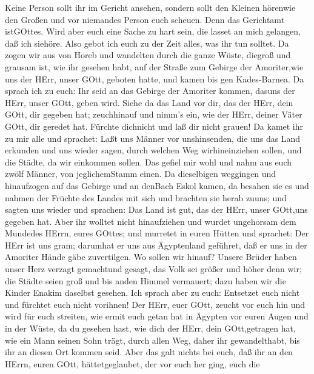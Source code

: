  Keine Person sollt ihr im Gericht ansehen, sondern sollt
den Kleinen hörenwie den Großen und vor niemandes Person euch scheuen.
Denn das Gerichtamt istGOttes. Wird aber euch eine Sache zu hart sein,
die lasset an mich gelangen, daß ich siehöre.  Also gebot
ich euch zu der Zeit alles, was ihr tun solltet.  Da zogen
wir aus von Horeb und wandelten durch die ganze Wüste, diegroß und
grausam ist, wie ihr gesehen habt, auf der Straße zum Gebirge der
Amoriter,wie uns der HErr, unser GOtt, geboten hatte, und kamen bis gen
Kades-Barnea.  Da sprach ich zu euch: Ihr seid an das
Gebirge der Amoriter kommen, dasuns der HErr, unser GOtt, geben wird.
 Siehe da das Land vor dir, das der HErr, dein GOtt, dir
gegeben hat; zeuchhinauf und nimm's ein, wie der HErr, deiner Väter
GOtt, dir geredet hat. Fürchte dichnicht und laß dir nicht grauen!
 Da kamet ihr zu mir alle und sprachet: Laßt uns Männer vor
unshinsenden, die uns das Land erkunden und uns wieder sagen, durch
welchen Weg wirhineinziehen sollen, und die Städte, da wir einkommen
sollen.  Das gefiel mir wohl und nahm aus euch zwölf
Männer, von jeglichemStamm einen.  Da dieselbigen weggingen
und hinaufzogen auf das Gebirge und an denBach Eskol kamen, da besahen
sie es  und nahmen der Früchte des Landes mit sich und
brachten sie herab zuuns; und sagten uns wieder und sprachen: Das Land
ist gut, das der HErr, unser GOtt,uns gegeben hat.  Aber
ihr wolltet nicht hinaufziehen und wurdet ungehorsam dem Mundedes HErrn,
eures GOttes;  und murretet in euren Hütten und sprachet:
Der HErr ist uns gram; darumhat er uns aus Ägyptenland geführet, daß er
uns in der Amoriter Hände gäbe zuvertilgen.  Wo sollen wir
hinauf? Unsere Brüder haben unser Herz verzagt gemachtund gesagt, das
Volk sei größer und höher denn wir; die Städte seien groß und bis anden
Himmel vermauert; dazu haben wir die Kinder Enakim daselbst gesehen.
 Ich sprach aber zu euch: Entsetzet euch nicht und fürchtet
euch nicht vorihnen!  Der HErr, euer GOtt, zeucht vor euch
hin und wird für euch streiten, wie ermit euch getan hat in Ägypten vor
euren Augen  und in der Wüste, da du gesehen hast, wie dich
der HErr, dein GOtt,getragen hat, wie ein Mann seinen Sohn trägt, durch
allen Weg, daher ihr gewandelthabt, bis ihr an diesen Ort kommen seid.
 Aber das galt nichts bei euch, daß ihr an den HErrn, euren
GOtt, hättetgeglaubet,  der vor euch her ging, euch die
